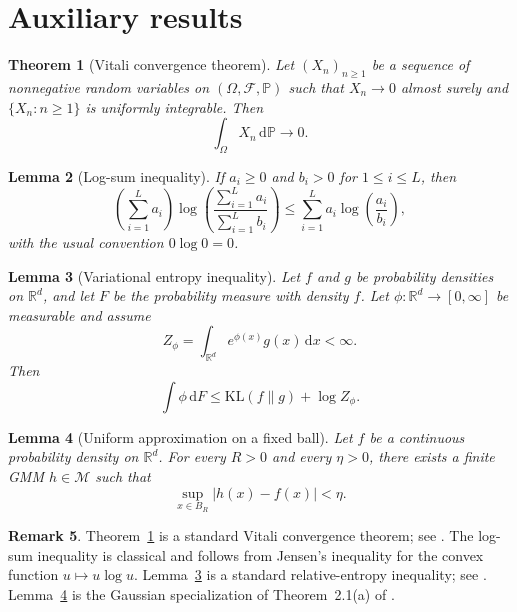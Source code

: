 \documentclass[11pt]{article}
\newtheorem{theorem}{Theorem}[section]
\newtheorem{lemma}[theorem]{Lemma}
\theoremstyle{definition}
\newtheorem{remark}[theorem]{Remark}
\begin{document}
\appendix

\section{Auxiliary results}\label{app:external}

\begin{theorem}[Vitali convergence theorem]
\label{thm:vitali}
Let $(X_n)_{n\ge1}$ be a sequence of nonnegative random variables on $(\Omega,\mathscr F,\mathbb P)$ such that $X_n\to0$ almost surely and $\{X_n:n\ge1\}$ is uniformly integrable. Then
\[
\int_\Omega X_n\,\mathrm d\mathbb P\to0.
\]
\end{theorem}

\begin{lemma}[Log-sum inequality]
\label{lem:logsum}
If $a_i\ge 0$ and $b_i>0$ for $1\le i\le L$, then
\[
\left(\sum_{i=1}^L a_i\right)\log\!\left(\frac{\sum_{i=1}^L a_i}{\sum_{i=1}^L b_i}\right)
\le \sum_{i=1}^L a_i \log\!\left(\frac{a_i}{b_i}\right),
\]
with the usual convention $0\log 0=0$.
\end{lemma}

\begin{lemma}[Variational entropy inequality]
\label{lem:variational}
Let $f$ and $g$ be probability densities on $\mathbb{R}^d$, and let $F$ be the probability measure with density $f$. Let $\phi:\mathbb{R}^d\to[0,\infty]$ be measurable and assume
\[
Z_\phi=\int_{\mathbb{R}^d} e^{\phi(x)}g(x)\,\mathrm{d}x<\infty.
\]
Then
\[
\int \phi\,\mathrm{d}F \le \mathrm{KL}(f\|g)+\log Z_\phi.
\]
\end{lemma}

\begin{lemma}[Uniform approximation on a fixed ball]
\label{lem:compactapprox}
Let $f$ be a continuous probability density on $\mathbb{R}^d$. For every $R>0$ and every $\eta>0$, there exists a finite GMM $h\in\mathcal M$ such that
\[
\sup_{x\in B_R} |h(x)-f(x)|<\eta.
\]
\end{lemma}

\begin{remark}
Theorem~\ref{thm:vitali} is a standard Vitali convergence theorem; see \citet[Chapter~16]{Billingsley1995}. The log-sum inequality is classical and follows from Jensen's inequality for the convex function $u\mapsto u\log u$. Lemma~\ref{lem:variational} is a standard relative-entropy inequality; see \citet[Chapter~1]{DupuisEllis1997}. Lemma~\ref{lem:compactapprox} is the Gaussian specialization of Theorem~2.1\textnormal{(a)} of \citet{NguyenTTEtAl2022}.
\end{remark}
\end{document}
